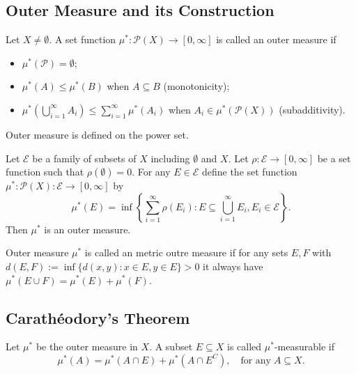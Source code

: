 \documentclass[class=book, crop=false]{standalone}
\begin{document}
        \subsection{Outer Measure and its Construction}
        \begin{definition}
            Let $X \neq \emptyset$. A set function $\mu^* : \mathscr{P}(X) \rightarrow [0, \infty]$ is called an outer measure if
            \begin{itemize}
                \item $\mu^*(\mathscr{P}) = \emptyset$;
                \item $\mu^*(A) \leq \mu^*(B)$ when $A \subseteq B$ (monotonicity);
                \item $\mu^*(\bigcup^{\infty}_{i = 1} A_i) \leq \sum^{\infty}_{i = 1} \mu^*(A_i)$ when $A_i \in \mu^*(\mathscr{P}(X))$ (subadditivity).
            \end{itemize}
        \end{definition}
        \begin{remark}
            Outer measure is defined on the power set.
        \end{remark}

        \begin{theorem}
            Let $\mathscr{E}$ be a family of subsets of $X$ including $\emptyset$ and $X$. Let $\rho : \mathscr{E} \rightarrow [0, \infty]$ be a set function such that $\rho(\emptyset) = 0$. For any $E \in \mathscr{E}$ define the set function $\mu^* : \mathscr{P}(X) : \mathscr{E} \rightarrow [0, \infty]$ by
            \begin{equation*}
                \mu^*(E) = \inf\left\{\sum^{\infty}_{i = 1} \rho(E_i) : E \subseteq \bigcup^{\infty}_{i = 1} E_i, E_i \in \mathscr{E}\right\}.
            \end{equation*}
            Then $\mu^*$ is an outer measure.
        \end{theorem}

        \begin{definition}
            Outer measure $\mu^*$ is called an metric outre measure if for any sets $E, F$ with $d(E, F) := \inf\{d(x, y) : x \in E, y \in E\} > 0$ it always have $\mu^*(E \cup F) = \mu^*(E) + \mu^*(F)$.
        \end{definition}

        \subsection{Carath\'eodory's Theorem}
        \begin{theorem}[$\mu^*$-Measurable]
            Let $\mu^*$ be the outer measure in $X$. A subset $E \subseteq X$ is called $\mu^*$-measurable if
            \begin{equation*}
                \mu^*(A) = \mu^*(A \cap E) + \mu^*(A \cap E^C), \quad\text{for any}\; A \subseteq X.
            \end{equation*}
        \end{theorem}
\end{document}
